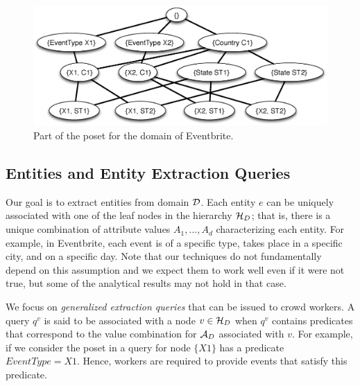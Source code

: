 \begin{figure}
	\begin{center}
	\includegraphics[clip,scale=0.25]{figs/eventsExLattice.eps}
		\vspace{-5pt}
	\caption{Part of the poset for the domain of Eventbrite.}
	\label{fig:eventslattice}
	\vspace{-5pt}
	\end{center}
\end{figure}

\subsection{Entities and Entity Extraction Queries}
\label{sec:queries}

 Our goal is to extract entities from domain $\mathcal{D}$. Each entity $e$ can be uniquely associated with one of the leaf nodes in the hierarchy $\mathcal{H}_D$; that is, there is a unique combination of attribute values $A_1, \ldots, A_d$ characterizing each entity. For example, in Eventbrite, each event is of a specific type, takes place in a specific city, and on a specific day. 
\iftr
Note that our techniques do not fundamentally depend on this assumption and we expect them to work well even if it were not true, but some of the analytical results may not hold in that case.
\fi

 We focus on {\em generalized extraction queries} that can be issued to crowd workers. A query $q^v$ is said to be associated with a node $v \in \mathcal{H}_D$ when $q^v$ contains predicates that correspond to the value combination for $\mathcal{A}_D$ associated with $v$. For example, if we consider the poset in  a query for node $\{X1\}$ has a predicate $EventType = X1$. Hence, workers are required to provide events that satisfy this predicate.

